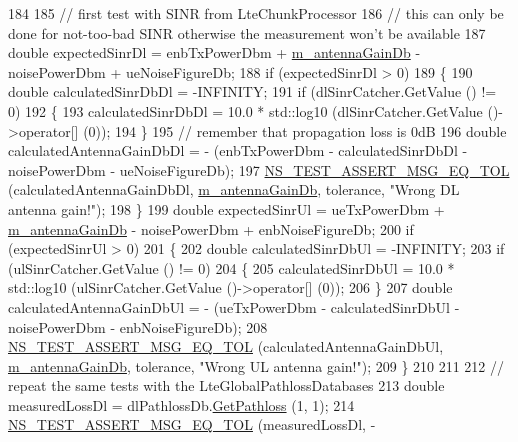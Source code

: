 \begin{DoxyCode}
184 
185   \textcolor{comment}{// first test with SINR from LteChunkProcessor}
186   \textcolor{comment}{// this can only be done for not-too-bad SINR otherwise the measurement won't be available}
187   \textcolor{keywordtype}{double} expectedSinrDl = enbTxPowerDbm + \hyperlink{classLteEnbAntennaTestCase_a0fa6f3b1360dea56b4931cda06709952}{m\_antennaGainDb} - noisePowerDbm + ueNoiseFigureDb;
188   \textcolor{keywordflow}{if} (expectedSinrDl > 0)
189     \{
190       \textcolor{keywordtype}{double} calculatedSinrDbDl = -INFINITY;
191       \textcolor{keywordflow}{if} (dlSinrCatcher.GetValue () != 0)
192         \{
193           calculatedSinrDbDl = 10.0 * std::log10 (dlSinrCatcher.GetValue ()->operator[] (0));
194         \}      
195       \textcolor{comment}{// remember that propagation loss is 0dB}
196       \textcolor{keywordtype}{double} calculatedAntennaGainDbDl = - (enbTxPowerDbm - calculatedSinrDbDl - noisePowerDbm - 
      ueNoiseFigureDb);      
197       \hyperlink{group__testing_ga9e7861b56b4e70db3b56044cb7a28e41}{NS\_TEST\_ASSERT\_MSG\_EQ\_TOL} (calculatedAntennaGainDbDl, 
      \hyperlink{classLteEnbAntennaTestCase_a0fa6f3b1360dea56b4931cda06709952}{m\_antennaGainDb}, tolerance, \textcolor{stringliteral}{"Wrong DL antenna gain!"});
198     \}
199   \textcolor{keywordtype}{double} expectedSinrUl = ueTxPowerDbm + \hyperlink{classLteEnbAntennaTestCase_a0fa6f3b1360dea56b4931cda06709952}{m\_antennaGainDb} - noisePowerDbm + enbNoiseFigureDb;
200   \textcolor{keywordflow}{if} (expectedSinrUl > 0)
201     \{      
202       \textcolor{keywordtype}{double} calculatedSinrDbUl = -INFINITY;
203       \textcolor{keywordflow}{if} (ulSinrCatcher.GetValue () != 0)
204         \{
205           calculatedSinrDbUl = 10.0 * std::log10 (ulSinrCatcher.GetValue ()->operator[] (0));
206         \}  
207       \textcolor{keywordtype}{double} calculatedAntennaGainDbUl = - (ueTxPowerDbm - calculatedSinrDbUl - noisePowerDbm - 
      enbNoiseFigureDb);
208       \hyperlink{group__testing_ga9e7861b56b4e70db3b56044cb7a28e41}{NS\_TEST\_ASSERT\_MSG\_EQ\_TOL} (calculatedAntennaGainDbUl, 
      \hyperlink{classLteEnbAntennaTestCase_a0fa6f3b1360dea56b4931cda06709952}{m\_antennaGainDb}, tolerance, \textcolor{stringliteral}{"Wrong UL antenna gain!"});
209     \}
210 
211 
212   \textcolor{comment}{// repeat the same tests with the LteGlobalPathlossDatabases}
213   \textcolor{keywordtype}{double} measuredLossDl = dlPathlossDb.\hyperlink{classns3_1_1LteGlobalPathlossDatabase_a06da4a86a140c90b2dad5f5fad9868f3}{GetPathloss} (1, 1);
214   \hyperlink{group__testing_ga9e7861b56b4e70db3b56044cb7a28e41}{NS\_TEST\_ASSERT\_MSG\_EQ\_TOL} (measuredLossDl, -

\end{DoxyCode}
